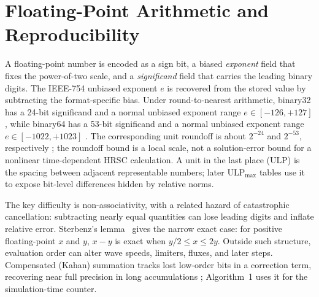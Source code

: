 \section{Floating-Point Arithmetic and Reproducibility}
A floating-point number is encoded as a sign bit, a biased \emph{exponent}
field that fixes the power-of-two scale, and a \emph{significand} field that
carries the leading binary digits. The IEEE-754 unbiased exponent $e$ is
recovered from the stored value by subtracting the format-specific bias. Under round-to-nearest arithmetic, binary32 has a 24-bit significand and a normal unbiased exponent range $e \in [-126, +127]$, while binary64 has a 53-bit significand and a normal unbiased exponent range $e \in [-1022, +1023]$ \citep{ieee754_2019,goldberg_1991}. The corresponding
unit roundoff is about \(2^{-24}\) and \(2^{-53}\), respectively
\citep{higham_2002}; the roundoff bound is a local scale, not a solution-error bound for a
nonlinear time-dependent HRSC calculation. A unit in the last place (ULP) is
the spacing between adjacent representable numbers; later
\(\mathrm{ULP}_{\max}\) tables use it to expose bit-level differences hidden
by relative norms.

The key difficulty is non-associativity, with a related hazard of catastrophic
cancellation: subtracting nearly equal quantities can lose leading digits and
inflate relative error. Sterbenz's lemma~\citep{sterbenz_1974} gives the narrow exact case: for
positive floating-point \(x\) and \(y\), \(x-y\) is exact when
\(y/2 \le x \le 2y\). Outside such structure, evaluation order can alter wave
speeds, limiters, fluxes, and later steps. Compensated (Kahan) summation tracks lost low-order bits in a
correction term, recovering near full precision in long accumulations
\citep{kahan_1965,higham_2002};
Algorithm~1 uses it for the simulation-time counter.

